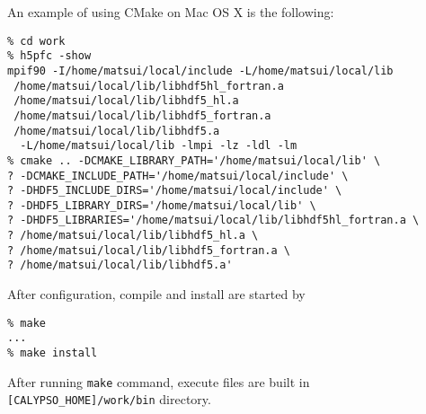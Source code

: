 %
An example of using CMake on Mac OS X is the following:
 \begin{verbatim}
% cd work
% h5pfc -show
mpif90 -I/home/matsui/local/include -L/home/matsui/local/lib
 /home/matsui/local/lib/libhdf5hl_fortran.a
 /home/matsui/local/lib/libhdf5_hl.a
 /home/matsui/local/lib/libhdf5_fortran.a
 /home/matsui/local/lib/libhdf5.a
  -L/home/matsui/local/lib -lmpi -lz -ldl -lm
% cmake .. -DCMAKE_LIBRARY_PATH='/home/matsui/local/lib' \
? -DCMAKE_INCLUDE_PATH='/home/matsui/local/include' \
? -DHDF5_INCLUDE_DIRS='/home/matsui/local/include' \
? -DHDF5_LIBRARY_DIRS='/home/matsui/local/lib' \
? -DHDF5_LIBRARIES='/home/matsui/local/lib/libhdf5hl_fortran.a \
? /home/matsui/local/lib/libhdf5_hl.a \
? /home/matsui/local/lib/libhdf5_fortran.a \
? /home/matsui/local/lib/libhdf5.a'
\end{verbatim}
%
After configuration, compile and install are started by
 \begin{verbatim}
% make
...
% make install
\end{verbatim}
%

After running \verb|make| command, execute files are built in \verb|[CALYPSO_HOME]/work/bin| directory.
